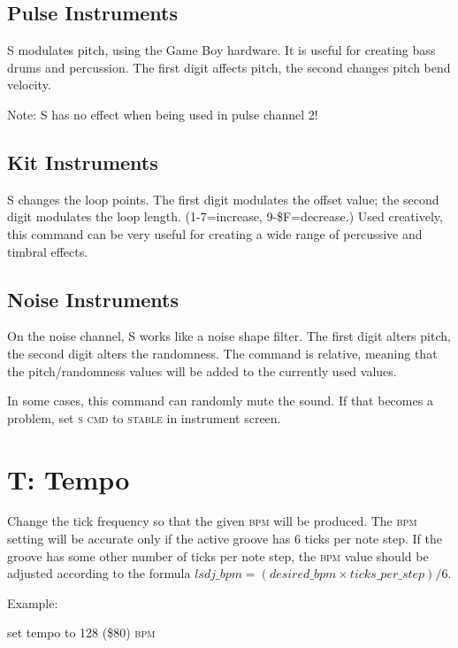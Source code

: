 \subsection{Pulse Instruments}

S modulates pitch, using the Game Boy hardware. It is useful for creating bass drums and percussion. The first digit affects pitch, the second changes pitch bend velocity.

Note: S has no effect when being used in pulse channel 2!

\subsection{Kit Instruments}

S changes the loop points. The first digit modulates the offset value; the second digit modulates the loop length. (1-7=increase, 9-\$F=decrease.) Used creatively, this command can be very useful for creating a wide range of percussive and timbral effects.

\subsection{Noise Instruments}
\label{command-shape-noise}

On the noise channel, S works like a noise shape filter.
The first digit alters pitch, the second digit alters the randomness.
The command is relative, meaning that the pitch/randomness values
will be added to the currently used values.

In some cases, this command can randomly mute the sound. If that becomes a problem, set
\textsc{s cmd} to \textsc{stable} in instrument screen.

\section{T: Tempo}

Change the tick frequency so that the given \textsc{bpm} will be produced. The \textsc{bpm} setting will be accurate only if the active groove has 6 ticks per note step. If the groove has some other number of ticks per note step, the \textsc{bpm} value should be adjusted according to the formula
\begin{math}
lsdj\_bpm = (desired\_bpm \times ticks\_per\_step)/{6}
\end{math}.

\begin{description}
\item Example:
\item[T80] set tempo to 128 (\$80) \textsc{bpm}
\end{description}

